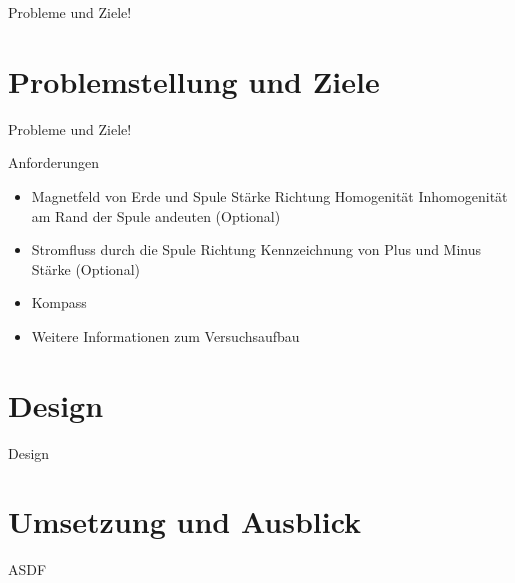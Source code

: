 \begin{frame}[fragile]{}
Probleme und Ziele!

\end{frame}

\part{Problemstellung und Ziele}
\label{part:golas}

\begin{frame}[fragile]{}
Probleme und Ziele!

\end{frame}

\begin{frame}[fragile]{Anforderungen}
\begin{itemize}
	\item Magnetfeld von Erde und Spule
	\subitem Stärke
	\subitem Richtung
	\subitem Homogenität
	\subitem Inhomogenität am Rand der Spule andeuten (Optional)
	\item Stromfluss durch die Spule
	\subitem Richtung
	\subitem Kennzeichnung von Plus und Minus
	\subitem Stärke (Optional)
	\item Kompass
	\item Weitere Informationen zum Versuchsaufbau
\end{itemize}
\end{frame}

\part{Design}
\label{part:design}

\begin{frame}[fragile]{}
Design
\end{frame}

\part{Umsetzung und Ausblick}
\label{part:practice}

\begin{frame}[fragile]{}
ASDF
\end{frame}